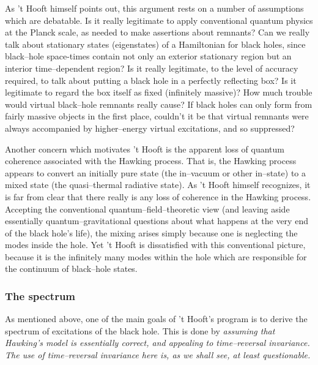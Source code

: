 As 't Hooft himself points out, this argument rests on a number of
assumptions which are debatable.  Is it really legitimate to apply
conventional quantum physics at the Planck scale, as needed to make
assertions about remnants?
Can we really talk about stationary states (eigenstates) of a
Hamiltonian for black holes, since black--hole
space-times contain not only an exterior
stationary region but an interior time--dependent region?  Is it
really legitimate, to the level of accuracy required, to talk about
putting a black hole in a perfectly reflecting box?  Is it legitimate
to regard the box itself as fixed (infinitely massive)?  How much
trouble would virtual black--hole remnants really cause?  If black
holes can only form from fairly massive objects in the first place,
couldn't it be that virtual remnants were always accompanied by
higher--energy virtual excitations, and so suppressed?

Another concern which motivates 't Hooft is the apparent loss of
quantum coherence associated with the Hawking process.  That is, the
Hawking process appears to convert an initially pure state (the
in--vacuum or other in--state) 
to a mixed state (the quasi--thermal radiative state).
As 't Hooft himself recognizes, it is far from clear that there really
is any loss of coherence in the Hawking process.  Accepting the
conventional quantum--field--theoretic view (and leaving aside
essentially quantum--gravitational questions about what happens at the
very end of the black hole's life), the mixing arises simply because
one is neglecting the modes inside the hole.  Yet 't Hooft is
dissatisfied with this conventional
picture, because it is the infinitely many
modes within the hole which are responsible for the continuum of
black--hole states. 


\subsubsection{The spectrum}

As mentioned above, one of the main goals of 't Hooft's program is to
derive the spectrum of excitations of the black hole.  This is done by
\it assuming \rm that Hawking's model is essentially correct, and
appealing to time--reversal invariance.  The use of time--reversal
invariance here is, as we shall see, at least questionable.

